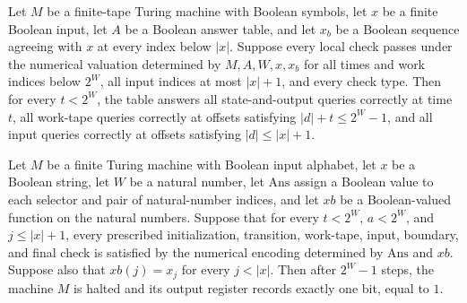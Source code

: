 \begin{theorem}
\label{Complexity.Meyer.correct_all}
\leanok
{}
Let $M$ be a finite-tape Turing machine with Boolean symbols, let $x$ be a finite
Boolean input, let $A$ be a Boolean answer table, and let $x_b$ be a Boolean sequence
agreeing with $x$ at every index below $|x|$. Suppose every local check passes under the
numerical valuation determined by $M,A,W,x,x_b$ for all times and work indices below
$2^W$, all input indices at most $|x|+1$, and every check type. Then for every $t<2^W$,
the table answers all state-and-output queries correctly at time $t$, all work-tape
queries correctly at offsets satisfying $|d|+t\le 2^W-1$, and all input queries
correctly at offsets satisfying $|d|\le |x|+1$.
\end{theorem}

\begin{theorem}
\label{Complexity.Meyer.sound_numeric}
\leanok
{}
Let $M$ be a finite Turing machine with Boolean input alphabet, let $x$ be a Boolean
string, let $W$ be a natural number, let $\mathrm{Ans}$ assign a Boolean value to each
selector and pair of natural-number indices, and let $xb$ be a Boolean-valued function
on the natural numbers. Suppose that for every $t<2^W$, $a<2^W$, and $j\le |x|+1$, every
prescribed initialization, transition, work-tape, input, boundary, and final check is
satisfied by the numerical encoding determined by $\mathrm{Ans}$ and $xb$. Suppose also
that $xb(j)=x_j$ for every $j<|x|$. Then after $2^W-1$ steps, the machine $M$ is halted
and its output register records exactly one bit, equal to $1$.
\end{theorem}
